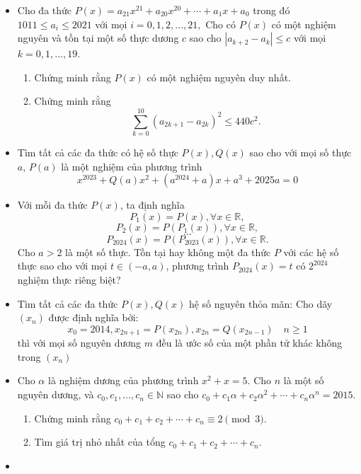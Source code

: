 \documentclass[11pt]{scrartcl}
\begin{document}
\begin{itemize}[label=, leftmargin=0em, itemsep=0.5em]
        \item \begin{btvn}
            Cho đa thức $P(x)=a_{21}x^{21}+a_{20}x^{20}+\cdots +a_1x+a_0$ trong đó $1011\leq a_i\leq 2021$ với mọi $i=0,1,2,...,21,$ Cho có $P(x)$ có một nghiệm nguyên và tồn tại một số thực dương $c$ sao cho $|a_{k+2}-a_k|\leq c$ với mọi $k=0,1,...,19.$
            \begin{enumerate}[label=(\alph*)]
                \item Chứng minh rằng $P(x)$ có một nghiệm nguyên duy nhất.
                \item Chứng minh rằng$$\sum_{k=0}^{10}(a_{2k+1}-a_{2k})^2\leq 440c^2.$$
            \end{enumerate}
        \end{btvn}
        \item \begin{btvn}
            Tìm tất cả các đa thức có hệ số thực $P(x), Q(x)$ sao cho với mọi số thực $a$, $P(a)$ là một nghiệm của phương trình $$x^{2023}+Q(a)x^2+(a^{2024}+a)x+a^3+2025a=0$$
        \end{btvn}
        \item \begin{btvn}
            Với mỗi đa thức $P(x)$, ta định nghĩa 
            $$P_1(x)=P(x), \forall x \in \mathbb{R},$$$$P_2(x)=P(P_1(x)),  \forall x \in \mathbb{R},$$$$...$$$$P_{2024}(x)=P(P_{2023}(x)), \forall x \in \mathbb{R}.$$
            Cho $a>2$ là một số thực. Tồn tại hay không một đa thức $P$ với các hệ số thực sao cho với mọi $t \in (-a, a)$, phương trình $P_{2024}(x)=t$ có $2^{2024}$ nghiệm thực riêng biệt?
        \end{btvn}
        \item \begin{btvn}
            Tìm tất cả các đa thức $P(x),Q(x)$ hệ số nguyên thỏa mãn: Cho dãy $(x_n)$ được định nghĩa bởi:
            \[x_0=2014,x_{2n+1}=P(x_{2n}),x_{2n}=Q(x_{2n-1}) \quad n\geq 1\]
            thì với mọi số nguyên dương $m$ đều là ước số của một phần tử khác không trong $(x_n )$
        \end{btvn}
        \item \begin{btvn}
            Cho $\alpha$ là nghiệm dương của phương trình $x^2+x=5$. Cho $n$ là một số nguyên dương, và $c_0,c_1,\ldots,c_n\in \mathbb{N}$ sao cho $ c_0+c_1\alpha+c_2\alpha^2+\cdots+c_n\alpha^n=2015. $
            \begin{enumerate}[label=(\alph*)]
                \item Chứng minh rằng $c_0+c_1+c_2+\cdots+c_n\equiv 2 \pmod{3}$.
                \item Tìm giá trị nhỏ nhất của tổng $c_0+c_1+c_2+\cdots+c_n$.
            \end{enumerate}
        \end{btvn}
        \item \begin{btvn}
            

\end{btvn}
\end{itemize}
\end{document}
